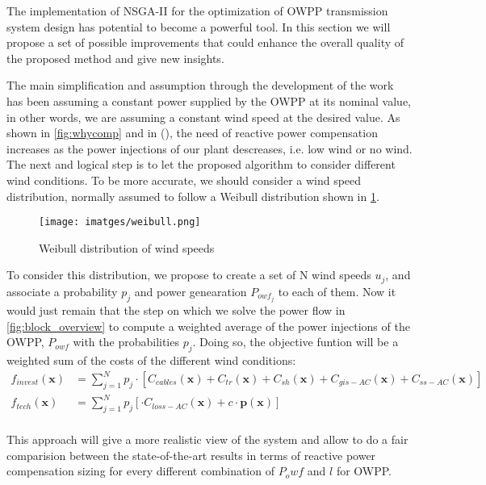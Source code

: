 \documentclass[a4paper,11pt, titlepage, twoside]{article}
\begin{document}
The implementation of NSGA-II for the optimization of OWPP transmission system design has potential to become a powerful tool. In this section we will propose a set of possible improvements
that could enhance the overall quality of the proposed method and give new insights.\par 

The main simplification and assumption through the development of the work has been assuming a constant power supplied by the OWPP
at its nominal value, in other words, we are assuming a constant wind speed at the desired value. As shown in \ref{fig:whycomp} and in (), the need of reactive power compensation increases as the power injections of our plant descreases, i.e. low wind or no wind.
The next and logical step is to let the proposed algorithm to consider different wind conditions. To be more accurate, we should consider a wind speed distribution, normally assumed to follow a Weibull distribution shown in \ref{fig:weibull}.

\begin{figure}[H]
    \centering
    \texttt{[image: imatges/weibull.png]}
    \caption{Weibull distribution of wind speeds \cite{paperbase}}
    \label{fig:weibull}
\end{figure}

To consider this distribution, we propose to create a set of N wind speeds $u_j$,  and associate a probability $p_j$ and power genearation $P_{owf_j}$ to each of them. Now it would just remain that the step on which we solve the power flow in \ref{fig:block_overview} to compute a 
weighted average of the power injections of the OWPP, $P_{owf}$  with the probabilities $p_j$. Doing so, the objective funtion will be a weighted sum of the costs of the different wind conditions:
\begin{equation}
\begin{aligned}
        f_{invest}(\mathbf{x}) &= \sum_{j=1}^{N} p_j \cdot  \left[ C_{cables}(\mathbf{x}) + C_{tr}(\mathbf{x}) + C_{sh}(\mathbf{x}) + C_{gis-AC}(\mathbf{x}) + C_{ss-AC}(\mathbf{x}) \right] \\
        f_{tech}(\mathbf{x}) &= \sum_{j=1}^{N} p_j \left[ \cdot C_{loss-AC}(\mathbf{x}) + c \cdot \mathbf{p(x)} \right] \\       
\end{aligned}   
\end{equation}

This approach will give a more realistic view of the system and allow to do a fair comparision between the state-of-the-art results in terms of reactive power compensation sizing for every different combination of $P_owf$ and $l$ for OWPP. \par
\end{document}
